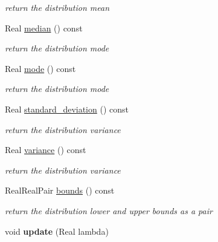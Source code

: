 \begin{DoxyCompactItemize}
\begin{DoxyCompactList}\small\item\em return the distribution mean \end{DoxyCompactList}\item 
Real \hyperlink{classPecos_1_1PoissonRandomVariable_ae1fff19ce29a79d657043a598523635d}{median} () const \label{classPecos_1_1PoissonRandomVariable_ae1fff19ce29a79d657043a598523635d}

\begin{DoxyCompactList}\small\item\em return the distribution mode \end{DoxyCompactList}\item 
Real \hyperlink{classPecos_1_1PoissonRandomVariable_a72d3d6926edd929cb3f8e12baa655f70}{mode} () const \label{classPecos_1_1PoissonRandomVariable_a72d3d6926edd929cb3f8e12baa655f70}

\begin{DoxyCompactList}\small\item\em return the distribution mode \end{DoxyCompactList}\item 
Real \hyperlink{classPecos_1_1PoissonRandomVariable_a6a4ed9624d511f8a4e4f509c82cb0706}{standard\+\_\+deviation} () const \label{classPecos_1_1PoissonRandomVariable_a6a4ed9624d511f8a4e4f509c82cb0706}

\begin{DoxyCompactList}\small\item\em return the distribution variance \end{DoxyCompactList}\item 
Real \hyperlink{classPecos_1_1PoissonRandomVariable_a4b8b05b2a9af92dad9cc304c2925a4eb}{variance} () const \label{classPecos_1_1PoissonRandomVariable_a4b8b05b2a9af92dad9cc304c2925a4eb}

\begin{DoxyCompactList}\small\item\em return the distribution variance \end{DoxyCompactList}\item 
Real\+Real\+Pair \hyperlink{classPecos_1_1PoissonRandomVariable_a4bdb95a8fa5fffaa0de5102f56963cf2}{bounds} () const \label{classPecos_1_1PoissonRandomVariable_a4bdb95a8fa5fffaa0de5102f56963cf2}

\begin{DoxyCompactList}\small\item\em return the distribution lower and upper bounds as a pair \end{DoxyCompactList}\item 
void {\bfseries update} (Real lambda)\label{classPecos_1_1PoissonRandomVariable_a964310b2429658c18f7a69d9c07f98b1}

\end{DoxyCompactItemize}
